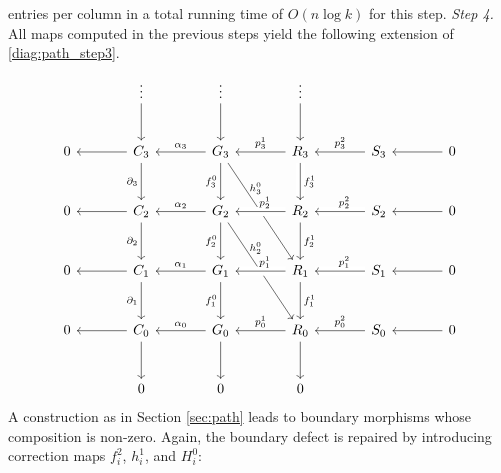 \documentclass[11pt]{article}
\begin{document}
entries per column in a total running time of $O(n\log k)$ for this step.
%
\textit{Step 4.} All maps computed in the previous steps yield the following extension of \eqref{diag:path_step3}.
%
\vspace{-12pt}
\begin{equation} \label{diag:logpath_double_complex_incomplete}
\begin{tikzcd} [column sep=large,row sep=large]
& \vdots \arrow[d] & \vdots \arrow[d] & \vdots \arrow[d] \\
0 & C_3 \arrow[l] \arrow[d,swap,"\partial_3"] & G_3 \arrow[l,swap,"\alpha_3"] \arrow[d,swap,"f_3^0"] \arrow[ddr,"h_3^0"{xshift=-10pt,yshift=10pt}] & R_3 \arrow[l,swap,"p_3^1"] \arrow[d,crossing over,"f_3^1"] & S_3 \arrow[l,swap,"p^2_3"] & 0 \arrow[l] \\
0 & C_2 \arrow[l] \arrow[d,swap,"\partial_2"] & G_2 \arrow[l,swap,"\alpha_2"] \arrow[d,swap,"f_2^0"] \arrow[ddr,"h_2^0"{xshift=-10pt,yshift=10pt}] & R_2 \arrow[l,swap,"p_2^1"{xshift=3pt},crossing over] \arrow[d,"f_2^1"] & S_2 \arrow[l,swap,"p^2_2"{xshift=3pt},crossing over]  & 0 \arrow[l] \\
0 & C_1 \arrow[l] \arrow[d,swap,"\partial_1"] & G_1 \arrow[l,swap,"\alpha_1"] \arrow[d,swap,"f_1^0"] & R_1 \arrow[l,swap,"p_1^1"{xshift=3pt},crossing over] \arrow[d,"f_1^1"] & S_1 \arrow[l,swap,"p^2_1"{xshift=3pt},crossing over] & 0 \arrow[l] \\
0 & C_0 \arrow[l] \arrow[d] & G_0 \arrow[l,swap,"\alpha_0"] \arrow[d] & R_0 \arrow[l,swap,"p_0^1"] \arrow[d] & S_0 \arrow[l,swap,"p^2_0"] & 0 \arrow[l] \\
& 0 & 0 & 0 
\end{tikzcd}
\end{equation} 
\noindent 
A construction as in Section \ref{sec:path} leads to boundary morphisms whose composition is non-zero. Again, the boundary defect is repaired by introducing correction maps $f^2_i$, $h^1_i$, and $H^0_i$:
%
\vspace{-12pt}
\end{document}
